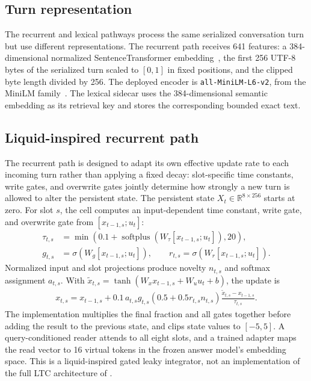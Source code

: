 \documentclass[conference]{IEEEtran}
\begin{document}
\subsection{Turn representation}
\label{sec:turnrep}
The recurrent and lexical pathways process the same serialized conversation turn but use different representations. The recurrent path receives 641 features: a 384-dimensional normalized SentenceTransformer embedding~\cite{reimers2019sentencebert}, the first 256 UTF-8 bytes of the serialized turn scaled to $[0,1]$ in fixed positions, and the clipped byte length divided by 256. The deployed encoder is \texttt{all-MiniLM-L6-v2}, from the MiniLM family~\cite{wang2020minilm}. The lexical sidecar uses the 384-dimensional semantic embedding as its retrieval key and stores the corresponding bounded exact text.

\subsection{Liquid-inspired recurrent path}
\label{sec:recurrent}
The recurrent path is designed to adapt its own effective update rate to each incoming turn rather than applying a fixed decay: slot-specific time constants, write gates, and overwrite gates jointly determine how strongly a new turn is allowed to alter the persistent state. The persistent state $X_t\in\mathbb{R}^{8\times256}$ starts at zero. For slot $s$, the cell computes an input-dependent time constant, write gate, and overwrite gate from $[x_{t-1,s};u_t]$:
\begin{align}
\tau_{t,s} &= \min\!\left(
0.1+\operatorname{softplus}(W_\tau[x_{t-1,s};u_t]),20\right),\\
g_{t,s} &= \sigma(W_g[x_{t-1,s};u_t]), \qquad
r_{t,s} = \sigma(W_r[x_{t-1,s};u_t]).
\end{align}
Normalized input and slot projections produce novelty $n_{t,s}$ and softmax assignment $a_{t,s}$. With
$\tilde{x}_{t,s}=\tanh(W_xx_{t-1,s}+W_uu_t+b)$, the update is
\begin{align}
x_{t,s}=x_{t-1,s}
+0.1\,a_{t,s}g_{t,s}(0.5+0.5r_{t,s}n_{t,s})
\frac{\tilde{x}_{t,s}-x_{t-1,s}}{\tau_{t,s}} .
\end{align}
The implementation multiplies the final fraction and all gates together before adding the result to the previous state, and clips state values to $[-5,5]$. A query-conditioned reader attends to all eight slots, and a trained adapter maps the read vector to 16 virtual tokens in the frozen answer model's embedding space. This is a liquid-inspired gated leaky integrator, not an implementation of the full LTC architecture of \citet{hasani2021ltc}.
\end{document}
